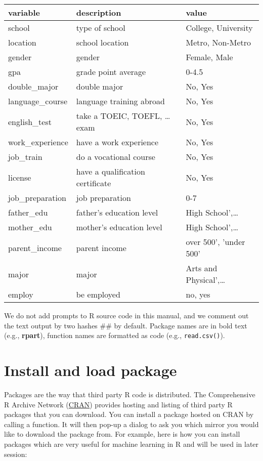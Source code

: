 \documentclass[
]{book}
\begin{document}
\begin{tabular}{l|l|l}
\hline
variable & description & value\\
\hline
school & type of school & College, University\\
\hline
location & school location & Metro, Non-Metro\\
\hline
gender & gender & Female, Male\\
\hline
gpa & grade point average & 0-4.5\\
\hline
double\_major & double major & No, Yes\\
\hline
language\_course & language training abroad & No, Yes\\
\hline
english\_test & take a TOEIC, TOEFL, … exam & No, Yes\\
\hline
work\_experience & have a work experience & No, Yes\\
\hline
job\_train & do a vocational course & No, Yes\\
\hline
license & have a qualification certificate & No, Yes\\
\hline
job\_preparation & job preparation & 0-7\\
\hline
father\_edu & father’s education level & High School',…\\
\hline
mother\_edu & mother’s education level & High School',…\\
\hline
parent\_income & parent income & over 500', 'under 500'\\
\hline
major & major & Arts and Physical',…\\
\hline
employ & be employed & no, yes\\
\hline
\end{tabular}

We do not add prompts to R source code in this manual, and we comment out the text output by two hashes \#\#
by default. Package names are in bold text (e.g., \textbf{rpart}), function names are formatted as code (e.g., \texttt{read.csv()}).

\hypertarget{install-and-load-package}{%
\section{Install and load package}\label{install-and-load-package}}

Packages are the way that third party R code is distributed. The Comprehensive R Archive Network (\href{https://cran.cmm.msu.ru/}{CRAN}) provides hosting and listing of third party R packages that you can download. You can install a package hosted on CRAN by calling a function. It will then pop-up a dialog to ask you which mirror you would like to download the package from. For example, here is how you can install packages which are very useful for machine learning in R and will be used in later session:
\end{document}
